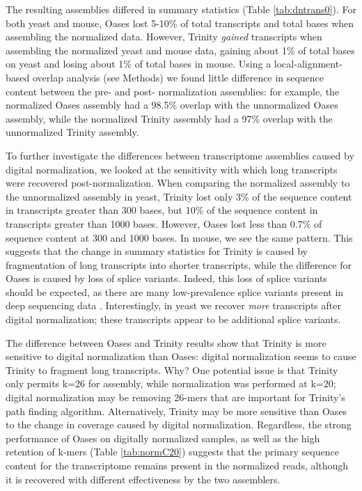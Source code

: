 \documentclass{pnastwo}
\begin{document}
\begin{article}
The resulting assemblies differed in summary statistics (Table
\ref{tab:dntrans0}).  For both yeast and mouse, Oases lost 5-10\% of
total transcripts and total bases when assembling the normalized data.  However, Trinity {\em gained}
transcripts when assembling the normalized yeast and mouse data,
gaining about 1\% of total bases on yeast and losing about 1\%
of total bases in mouse.  Using a local-alignment-based overlap
analysis (see Methods) we found little difference in sequence
content between the pre- and post- normalization assemblies: for
example, the normalized Oases assembly had a 98.5\% overlap with the
unnormalized Oases assembly, while the normalized Trinity assembly had
a 97\% overlap with the unnormalized Trinity assembly.

To further investigate the differences between transcriptome
assemblies caused by digital normalization, we looked at the
sensitivity with which long transcripts were recovered
post-normalization.  When comparing the normalized assembly to the
unnormalized assembly in yeast, Trinity lost only 3\% of the sequence
content in transcripts greater than 300 bases, but 10\% of the
sequence content in transcripts greater than 1000 bases.  However,
Oases lost less than 0.7\% of sequence content at 300 and
1000 bases.  In mouse, we see the same pattern.
This suggests that the change in summary statistics for
Trinity is caused by fragmentation of long transcripts into shorter
transcripts, while the difference for Oases is caused by loss of
splice variants.  Indeed, this
loss of splice variants should be expected, as there are many low-prevalence splice
variants present in deep sequencing data \cite{pubmed21151575}.
Interestingly, in yeast we recover {\em more} transcripts after
digital normalization; these transcripts appear to be additional splice
variants.


The difference between Oases and Trinity results show that Trinity is
more sensitive to digital normalization than Oases: digital
normalization seems to cause Trinity to fragment long transcripts.
Why?  One potential issue is that Trinity only permits k=26 for
assembly, while normalization was performed at k=20; digital
normalization may be removing 26-mers that are important for Trinity's
path finding algorithm.  Alternatively, Trinity may be more sensitive
than Oases to the change in coverage caused by digital normalization.
Regardless, the strong performance of Oases on digitally normalized
samples, as well as the high retention of k-mers (Table \ref{tab:normC20})
suggests that the primary sequence content for the transcriptome remains
present in the normalized reads, although it is recovered with different
effectiveness by the two assemblers.


\end{article}
\end{document}
